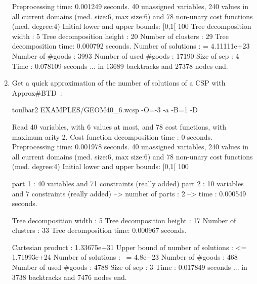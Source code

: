 \begin{enumerate}
{\begin{DoxyCode}
Preprocessing time: 0.001249 seconds.
40 unassigned variables, 240 values in all current domains (med. size:6, max size:6) and 78 non-unary cost functions (med. degree:4)
Initial lower and upper bounds: [0,1[ 100%
Tree decomposition width  : 5
Tree decomposition height : 20
Number of clusters        : 29
Tree decomposition time: 0.000792 seconds.
Number of solutions    : =  4.11111e+23
Number of #goods       :    3993
Number of used #goods  :    17190
Size of sep            :    4
Time                   :    0.078109 seconds
... in 13689 backtracks and 27378 nodes
end.
\end{DoxyCode}}
\item Get a quick approximation of the number of solutions of a CSP with Approx\#BTD~\cite{Favier09a}:
\begin{DoxyCode}
	toulbar2 EXAMPLES/GEOM40_6.wcsp -O=-3 -a -B=1 -D
\end{DoxyCode}
{\scriptsize
\begin{DoxyCode}
Read 40 variables, with 6 values at most, and 78 cost functions, with maximum arity 2.
Cost function decomposition time : 0 seconds.
Preprocessing time: 0.001978 seconds.
40 unassigned variables, 240 values in all current domains (med. size:6, max size:6) and 78 non-unary cost functions (med. degree:4)
Initial lower and upper bounds: [0,1[ 100%

part 1 : 40 variables and 71 constraints (really added)
part 2 : 10 variables and 7 constraints (really added)
--> number of parts : 2
--> time : 0.000549 seconds. 

Tree decomposition width  : 5
Tree decomposition height : 17
Number of clusters        : 33
Tree decomposition time: 0.000967 seconds.

Cartesian product 		   :    1.33675e+31
Upper bound of number of solutions : <= 1.71993e+24
Number of solutions    : ~= 4.8e+23
Number of #goods       :    468
Number of used #goods  :    4788
Size of sep            :    3
Time                   :    0.017849 seconds
... in 3738 backtracks and 7476 nodes
end.
\end{DoxyCode}}
\end{enumerate}
